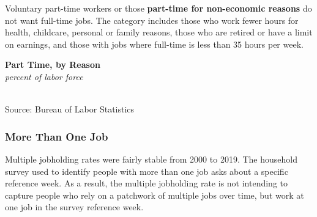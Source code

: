\documentclass{report}
\makeatletter
\newcommand{\tbllink}[1]{\href{https://raw.githubusercontent.com/bdecon/US-chartbook/master/chartbook/data/#1}{\faTable}}
\newcommand*\short[1]{\expandafter\@gobbletwo\number\numexpr#1\relax}
\newcommand{\absnode}[3]{\node[below right, align=left] at (axis cs: #1,#2) {#3};}
\newcommand{\shdateaxisticks}{
		date coordinates in=x, axis line style={draw=none},
		xmax={2022-03-15},
		max space between ticks=40,	    
		xtick={{1990-01-01}, {1995-01-01}, {2000-01-01}, 
			{2005-01-01}, {2010-01-01}, {2015-01-01}, {2020-01-01}},
		minor xtick={},
		enlarge y limits={0.06}, enlarge x limits={0.01},
		}
\newcommand{\bbar}[2]{extra #1 ticks = {{#2}}, extra #1 tick labels = ,
		extra #1 tick style = {grid=major, grid style={thick, black!25}},}
\newcommand{\stdline}[4]{\addplot[very thick, no markers, color=#1] 
		table [x=#2, y=#3, col sep=comma] {#4};	}
\newcommand{\rebars}{
		\fill[color=black!10] (axis cs:{2007-12-01},\pgfkeysvalueof{/pgfplots/ymin}) rectangle 
			(axis cs:{2009-07-01}, \pgfkeysvalueof{/pgfplots/ymax});
		\fill[color=black!10] (axis cs:{2001-03-01},\pgfkeysvalueof{/pgfplots/ymin}) rectangle 
			(axis cs:{2001-11-01}, \pgfkeysvalueof{/pgfplots/ymax});
		\fill[color=black!10] (axis cs:{2020-02-01},\pgfkeysvalueof{/pgfplots/ymin}) rectangle 
			(axis cs:{2020-05-01}, \pgfkeysvalueof{/pgfplots/ymax});}
\makeatother
\begin{document}
{{\begin{minipage}{0.76\textwidth}
Voluntary part-time workers or those \textbf{part-time for non-economic reasons} do not want full-time jobs. The category includes those who work fewer hours for health, childcare, personal or family reasons, those who are retired or have a limit on earnings, and those with jobs where full-time is less than 35 hours per week. 
\vspace{0.5mm}

\begin{minipage}{0.56\textwidth}
\normalsize \textbf{Part Time, by Reason}\\
\footnotesize{\textit{percent of labor force}}\\
\hspace*{-2mm} \\
\footnotesize{Source: Bureau of Labor Statistics} \hfill \tbllink{parttime.csv} 
\end{minipage}\hfill
\begin{minipage}{0.38\textwidth}
\small 
\end{minipage}
\vspace{1mm}

\subsubsection*{More Than One Job}
\small Multiple jobholding rates were fairly stable from 2000 to 2019. The household survey used to identify people with more than one job asks about a specific reference week. As a result, the multiple jobholding rate is not intending to capture people who rely on a patchwork of multiple jobs over time, but work at one job in the survey reference week. 
\vspace{0.5mm}


\end{minipage}}}
\end{document}
